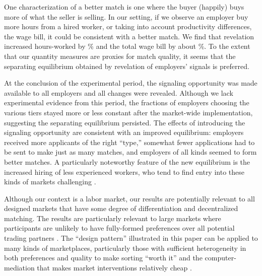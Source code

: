 One characterization of a better match is one where the buyer (happily) buys more of what the seller is selling.
In our setting, if we observe an employer buy more hours from a hired worker, or taking into account productivity differences, the wage bill, it could be consistent with a better match.
We find that revelation increased hours-worked by \HoursEffectPool{}\% and the total wage bill by about \WageBillEffectPool{}\%.
To the extent that our quantity measures are proxies for match quality, it seems that the separating equilibrium obtained by revelation of employers' signals is preferred.

At the conclusion of the experimental period, the signaling opportunity was made available to all employers and all changes were revealed.
Although we lack experimental evidence from this period, the fractions of employers choosing the various tiers stayed more or less constant after the market-wide implementation, suggesting the separating equilibrium persisted.
The effects of introducing the signaling opportunity are consistent with an improved equilibrium:
employers received more applicants of the right ``type,'' somewhat fewer applications had to be sent to make just as many matches, and employers of all kinds seemed to form better matches.
A particularly noteworthy feature of the new equilibrium is the increased hiring of less experienced workers, who tend to find entry into these kinds of markets challenging \citep{pallais2010inefficient, stanton2011landing}. 

Although our context is a labor market, our results are potentially relevant to all designed markets that have some degree of differentiation and decentralized matching.
The results are particularly relevant to large markets where participants are unlikely to have fully-formed preferences over all potential trading partners \citep{acemoglu2017, ashlagi2017communication}.
The ``design pattern'' illustrated in this paper can be applied to many kinds of marketplaces, particularly those with sufficient heterogeneity in both preferences and quality to make sorting ``worth it'' and the computer-mediation that makes market interventions relatively cheap \citep{varian2010computer}. 

